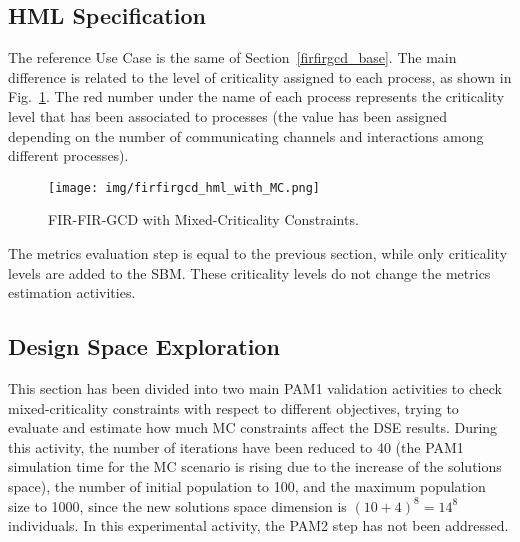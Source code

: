 \subsection{HML Specification}
%
The reference Use Case is the same of Section~\ref{firfirgcd_base}. The main difference is related to the level of criticality assigned to each process, as shown in Fig.~\ref{firfirgcd_hml_MC}. The red number under the name of each process represents the criticality level that has been associated to processes (the value has been assigned depending on the number of communicating channels and interactions among different processes). \par
%
\begin{figure}[htbp]
	\centerline{\texttt{[image: img/firfirgcd\_hml\_with\_MC.png]}}
	\caption{ FIR-FIR-GCD with Mixed-Criticality Constraints.}
	\label{firfirgcd_hml_MC}
\end{figure}
%
The metrics evaluation step is equal to the previous section, while only criticality levels are added to the SBM. These criticality levels do not change the metrics estimation activities.
%
\subsection{Design Space Exploration}
%
This section has been divided into two main PAM1 validation activities to check mixed-criticality constraints with respect to different objectives, trying to evaluate and estimate how much MC constraints affect the DSE results. During this activity, the number of iterations have been reduced to 40 (the PAM1 simulation time for the MC scenario is rising due to the increase of the solutions space), the number of initial population to 100, and the maximum population size to 1000, since the new solutions space dimension is $(10 + 4)^8 = 14^8$ individuals. In this experimental activity, the PAM2 step has not been addressed.
%
